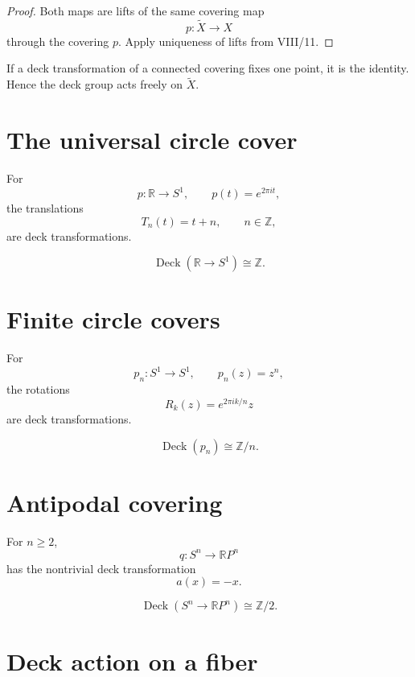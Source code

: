 \begin{proof}
Both maps are lifts of the same covering map
\[
p:\widetilde X\to X
\]
through the covering \(p\).  Apply uniqueness of lifts from VIII/11.
\end{proof}

\begin{corollary}
\label{cor:viii12-free}
If a deck transformation of a connected covering fixes one point, it is the
identity.  Hence the deck group acts freely on \(\widetilde X\).
\end{corollary}

\section{The universal circle cover}

For
\[
p:\mathbb R\to S^1,\qquad p(t)=e^{2\pi it},
\]
the translations
\[
T_n(t)=t+n,\qquad n\in\mathbb Z,
\]
are deck transformations.

\begin{theorem}
\label{thm:viii12-circle-deck}
\[
\operatorname{Deck}(\mathbb R\to S^1)\cong\mathbb Z.
\]
\end{theorem}

\section{Finite circle covers}

For
\[
p_n:S^1\to S^1,\qquad p_n(z)=z^n,
\]
the rotations
\[
R_k(z)=e^{2\pi ik/n}z
\]
are deck transformations.

\begin{theorem}
\label{thm:viii12-power-deck}
\[
\operatorname{Deck}(p_n)\cong\mathbb Z/n.
\]
\end{theorem}

\section{Antipodal covering}

For \(n\ge2\),
\[
q:S^n\to\mathbb RP^n
\]
has the nontrivial deck transformation
\[
a(x)=-x.
\]

\begin{proposition}
\label{prop:viii12-projective-deck}
\[
\operatorname{Deck}(S^n\to\mathbb RP^n)\cong\mathbb Z/2.
\]
\end{proposition}

\section{Deck action on a fiber}

